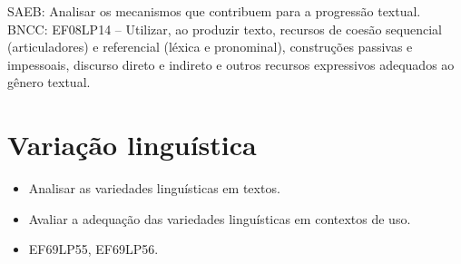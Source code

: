 SAEB: Analisar os mecanismos que contribuem para a progressão textual.
BNCC: EF08LP14 -- Utilizar, ao produzir texto, recursos de coesão
sequencial (articuladores) e referencial (léxica e pronominal),
construções passivas e impessoais, discurso direto e indireto e outros
recursos expressivos adequados ao gênero textual.

\chapter{Variação linguística}


\begin{itemize}
\item Analisar as variedades linguísticas em
textos.
\item Avaliar a adequação das variedades linguísticas em contextos
de uso.
\end{itemize}


\begin{itemize}
\tightlist
\item
  EF69LP55, EF69LP56.
\end{itemize}


